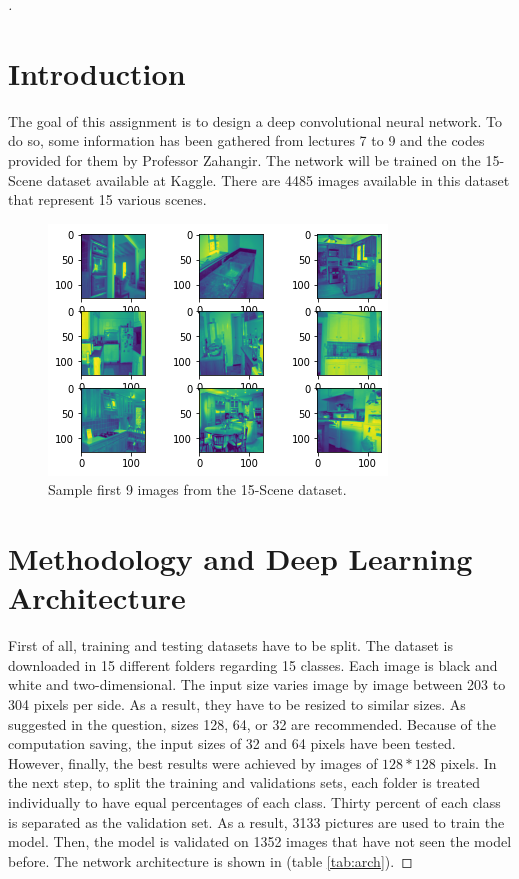 \documentclass[12pt,oneside,geqno]{article}
\begin{document}
	\begin{proof}[\color{red}{Solution}]
		
		\section{Introduction}
		\renewcommand*{\theHsection}{chX.\the\value{section}}
		The goal of this assignment is to design a deep convolutional neural network. To do so, some information has been gathered from lectures 7 to 9 and the codes provided for them by Professor Zahangir. The network will be trained on the 15-Scene dataset available at Kaggle. There are 4485 images available in this dataset that represent 15 various scenes.
		
		\begin{figure}
			\centering
			\includegraphics[width=\textwidth]{../figs/q2_sample.png}
			\caption{Sample first 9 images from the 15-Scene dataset.}
			\label{img:q2_sample}
		\end{figure}
		
		
		\section{Methodology and Deep Learning Architecture}
		First of all, training and testing datasets have to be split. The dataset is downloaded in 15 different folders regarding 15 classes. Each image is black and white and two-dimensional. The input size varies image by image between 203 to 304 pixels per side. As a result, they have to be resized to similar sizes. As suggested in the question, sizes 128, 64, or 32 are recommended. Because of the computation saving, the input sizes of 32 and 64 pixels have been tested. However, finally, the best results were achieved by images of \(128*128\) pixels. In the next step, to split the training and validations sets, each folder is treated individually to have equal percentages of each class. Thirty percent of each class is separated as the validation set. As a result, 3133 pictures are used to train the model. Then, the model is validated on 1352 images that have not seen the model before. 
		The network architecture is shown in (table \ref{tab:arch}).  
		

\end{proof}
\end{document}
